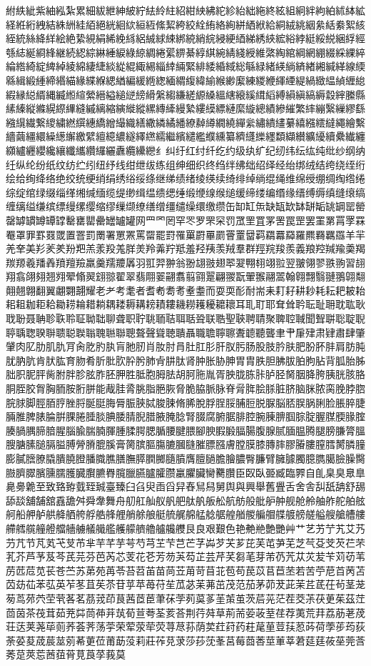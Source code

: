 紨紩紪紫紬紭紮累細紱紲紳紴紵紶紷紸紹紺紻紼紽紾紿絀絁終絃組絅絆絇絈絉絊絋経絍絎絏結絑絒絓絔絕絖絗絘絙絚絛絜絝絞絟絠絡絢絣絤絥給絧絨絩絪絫絬絭絮絯絰統絲絳絴絵絶絷絸絹絺絻絼絽絾絿綀綁綂綃綄綅綆綇綈綉綊綋綌綍綎綏綐綑綒經綔綕綖綗綘継続綛綜綝綞綟綠綡綢綣綤綥綦綧綨綩綪綫綬維綮綯綰綱網綳綴綵綶綷綸綹綺綻綼綽綾綿緀緁緂緃緄緅緆緇緈緉緊緋緌緍緎総緐緑緒緓緔緕緖緗緘緙線緛緜緝緞緟締緡緢緣緤緥緦緧編緩緪緫緬緭緮緯緰緱緲緳練緵緶緷緸緹緺緻緼緽緾緿縀縁縂縃縄縅縆縇縈縉縊縋縌縍縎縏縐縑縒縓縔縕縖縗縘縙縚縛縜縝縞縟縠縡縢縣縤縥縦縧縨縩縪縫縬縭縮縯縰縱縲縳縴縵縶縷縸縹縺縻縼總績縿繀繁繂繃繄繅繆繇繈繉繊繋繌繍繎繏繐繑繒繓織繕繖繗繘繙繚繛繜繝繞繟繠繡繢繣繤繥繦繧繨繩繪繫繬繭繮繯繰繱繲繳繴繵繶繷繸繹繺繻繼繽繾繿纀纁纂纃纄纅纆纇纈纉纊纋續纍纎纏纐纑纒纓纔纕纖纗纘纙纚纛纜纝纞纟纠纡红纣纤纥约级纨纩纪纫纬纭纮纯纰纱纲纳纴纵纶纷纸纹纺纻纼纽纾线绀绁绂练组绅细织终绉绊绋绌绍绎经绐绑绒结绔绕绖绗绘给绚绛络绝绞统绠绡绢绣绤绥绦继绨绩绪绫绬续绮绯绰绱绲绳维绵绶绷绸绹绺绻综绽绾绿缀缁缂缃缄缅缆缇缈缉缊缋缌缍缎缏缐缑缒缓缔缕编缗缘缙缚缛缜缝缞缟缠缡缢缣缤缥缦缧缨缩缪缫缬缭缮缯缰缱缲缳缴缵缶缷缸缹缺缻缼缽缾缿罀罁罂罃罄罅罆罇罈罉罊罋罌罍罎罏罐网罒罓罔罕罖罗罘罙罚罛罜罝罞罟罠罡罢罣罤罥罦罧罨罩罪罫罬罭置罯罰罱署罳罴罵罶罷罸罹罺罻罼罽罾罿羀羁羂羃羄羅羆羇羈羉羊羋羌羍美羏羐羑羒羓羔羕羖羗羘羙羚羛羜羝羞羟羠羡羢羣群羥羦羧羨義羪羫羬羭羮羯羰羱羲羳羴羵羶羷羸羹羺羻羼羽羾羿翀翁翂翃翄翅翆翇翈翉翊翋翌翍翎翏翐翑習翓翔翕翖翗翘翙翚翛翜翝翞翟翠翡翢翣翤翥翦翧翨翩翪翫翬翭翮翯翰翱翲翳翴翵翶翷翸翹翺翻翼翽翾翿耀老耂考耄者耆耇耈耉耊耋而耍耎耏耐耑耒耓耔耕耖耗耘耙耚耛耜耝耞耟耠耡耢耣耤耥耦耧耨耩耪耫耬耭耮耯耰耱耲耳耴耵耶耷耸耹耺耻耼耽耾耿聀聁聂聃聄聅聆聇聈聉聊聋职聍聎聏聐聑聒聓联聕聖聗聘聙聚聛聜聝聞聟聠聡聢聣聤聥聦聧聨聩聪聫聬聭聮聯聰聱聲聳聴聵聶職聸聹聺聻聼聽聾聿肀肁肂肃肄肅肆肇肈肉肊肋肌肍肎肏肐肑肒肓肔肕肖肗肘肙肚肛肜肝肞肟肠股肢肣肤肥肦肧肨肩肪肫肬肭肮肯肰肱育肳肴肵肶肷肸肹肺肻肼肽肾肿胀胁胂胃胄胅胆胇胈胉胊胋背胍胎胏胐胑胒胓胔胕胖胗胘胙胚胛胜胝胞胟胠胡胢胣胤胥胦胧胨胩胪胫胬胭胮胯胰胱胲胳胴胵胶胷胸胹胺胻胼能胾胿脀脁脂脃脄脅脆脇脈脉脊脋脌脍脎脏脐脑脒脓脔脕脖脗脘脙脚脛脜脝脞脟脠脡脢脣脤脥脦脧脨脩脪脫脬脭脮脯脰脱脲脳脴脵脶脷脸脹脺脻脼脽脾脿腀腁腂腃腄腅腆腇腈腉腊腋腌腍腎腏腐腑腒腓腔腕腖腗腘腙腚腛腜腝腞腟腠腡腢腣腤腥腦腧腨腩腪腫腬腭腮腯腰腱腲腳腴腵腶腷腸腹腺腻腼腽腾腿膀膁膂膃膄膅膆膇膈膉膊膋膌膍膎膏膐膑膒膓膔膕膖膗膘膙膚膛膜膝膞膟膠膡膢膣膤膥膦膧膨膩膪膫膬膭膮膯膰膱膲膳膴膵膶膷膸膹膺膻膼膽膾膿臀臁臂臃臄臅臆臇臈臉臊臋臌臍臎臏臐臑臒臓臔臕臖臗臘臙臚臛臜臝臞臟臠臡臢臣臤臥臦臧臨臩自臫臬臭臮臯臰臱臲至致臵臶臷臸臹臺臻臼臽臾臿舀舁舂舃舄舅舆與興舉舊舋舌舍舎舏舐舑舒舓舔舕舖舗舘舙舚舛舜舝舞舟舠舡舢舣舤舥舦舧舨舩航舫般舭舮舯舰舱舲舳舴舵舶舷舸船舺舻舼舽舾舿艀艁艂艃艄艅艆艇艈艉艊艋艌艍艎艏艐艑艒艓艔艕艖艗艘艙艚艛艜艝艞艟艠艡艢艣艤艥艦艧艨艩艪艫艬艭艮良艰艱色艳艴艵艶艷艸艹艺艻艼艽艾艿芀芁节芃芄芅芆芇芈芉芊芋芌芍芎芏芐芑芒芓芔芕芖芗芘芙芚芛芜芝芞芟芠芡芢芣芤芥芦芧芨芩芪芫芬芭芮芯芰花芲芳芴芵芶芷芸芹芺芻芼芽芾芿苀苁苂苃苄苅苆苇苈苉苊苋苌苍苎苏苐苑苒苓苔苕苖苗苘苙苚苛苜苝苞苟苠苡苢苣苤若苦苧苨苩苪苫苬苭苮苯苰英苲苳苴苵苶苷苸苹苺苻苼苽苾苿茀茁茂范茄茅茆茇茈茉茊茋茌茍茎茏茐茑茒茓茔茕茖茗茘茙茚茛茜茝茞茟茠茡茢茣茤茥茦茧茨茩茪茫茬茭茮茯茰茱茲茳茴茵茶茷茸茹茺茻茼茽茾茿荀荁荂荃荄荅荆荇荈草荊荋荌荍荎荏荐荑荒荓荔荕荖荗荘荙荚荛荜荝荞荟荠荡荢荣荤荥荦荧荨荩荪荫荬荭荮药荰荱荲荳荴荵荶荷荸荹荺荻荼荽荾荿莀莁莂莃莄莅莆莇莈莉莊莋莌莍莎莏莐莑莒莓莔莕莖莗莘莙莚莛莜莝莞莟莠莡莢莣莤莥莦莧莨莩莪莫
